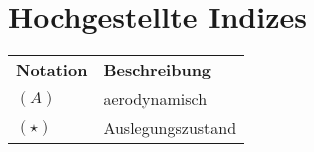 %
\section*{Hochgestellte Indizes}
\begin{longtable}{lp{13cm}}
	\textbf{Notation} & \textbf{Beschreibung}\\
	\ensuremath{(A)}			& aerodynamisch \\
	\ensuremath{(\star)}		& Auslegungszustand 
	
	
	
\end{longtable}
%
\addtocounter{table}{-4}
